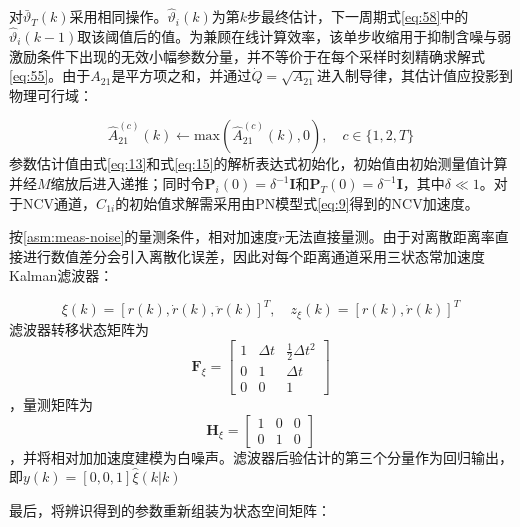 对$\bar{\vartheta}_{T}(k)$采用相同操作。$\hat{\vartheta}_{i}(k)$为第$k$步最终估计，下一周期式\eqref{eq:58}中的$\hat{\vartheta}_{i}(k - 1)$取该阈值后的值。为兼顾在线计算效率，该单步收缩用于抑制含噪与弱激励条件下出现的无效小幅参数分量，并不等价于在每个采样时刻精确求解式\eqref{eq:55}。由于${A_{21}}$是平方项之和，并通过$\dot Q = \sqrt {{A_{21}}} $进入制导律，其估计值应投影到物理可行域：

\begin{equation}
\label{eq:61}
\hat A_{21}^{(c)}(k) \leftarrow {\text{max}}(\hat A_{21}^{(c)}(k),0),\quad c \in \{ 1,2,T\}
\end{equation}
参数估计值由式\eqref{eq:13}和式\eqref{eq:15}的解析表达式初始化，初始值由初始测量值计算并经$M$缩放后进入递推；同时令${{\mathbf{P}}_i}(0) = {\delta ^{ - 1}}{\mathbf{I}}$和${{\mathbf{P}}_T}(0) = {\delta ^{ - 1}}{\mathbf{I}}$，其中$\delta  \ll 1$。对于NCV通道，${C_{1i}}$的初始值求解需采用由PN模型式\eqref{eq:9}得到的NCV加速度。

按\cref{asm:meas-noise}的量测条件，相对加速度$\ddot r$无法直接量测。由于对离散距离率直接进行数值差分会引入离散化误差，因此对每个距离通道采用三状态常加速度Kalman滤波器：

\begin{equation}
\label{eq:62}
\xi (k) = {[r(k),\dot r(k),\ddot r(k)]^T},\quad {z_\xi }(k) = {[r(k),\dot r(k)]^T}
\end{equation}
滤波器转移状态矩阵为\[{{\mathbf{F}}_\xi } = \left[ {\begin{array}{*{20}{c}}
  1&{\Delta t}&{\tfrac{1}{2}\Delta {t^2}} \\ 
  0&1&{\Delta t} \\ 
  0&0&1 
\end{array}} \right]\]，量测矩阵为\[{{\mathbf{H}}_\xi } = \begin{bmatrix}
  1 & 0 & 0 \\
  0 & 1 & 0
\end{bmatrix}\]，并将相对加加速度建模为白噪声。滤波器后验估计的第三个分量作为回归输出，即$y(k) = [0,0,1]\hat{\xi}(k|k)$

最后，将辨识得到的参数重新组装为状态空间矩阵：

